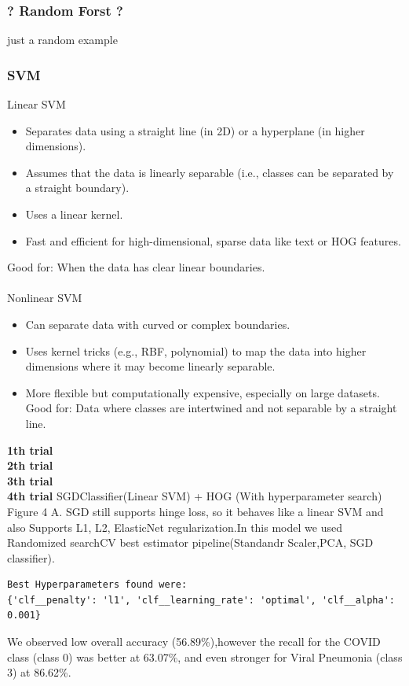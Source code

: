 \documentclass{article}
\begin{document}
\subsubsection{? Random Forst ?}
just a random example

\subsubsection{SVM}
Linear SVM
\begin{itemize}
    \item Separates data using a straight line (in 2D) or a hyperplane (in higher dimensions).
    \item Assumes that the data is linearly separable (i.e., classes can be separated by a straight boundary).
    \item Uses a linear kernel.
    \item Fast and efficient for high-dimensional, sparse data like text or HOG features.
\end{itemize}
Good for: When the data has clear linear boundaries.\\
\\
Nonlinear SVM 
\begin{itemize}
    \item Can separate data with curved or complex boundaries.
    \item Uses kernel tricks (e.g., RBF, polynomial) to map the data into higher dimensions where it may become linearly separable.
    \item More flexible but computationally expensive, especially on large datasets.
Good for: Data where classes are intertwined and not separable by a straight line.
\end{itemize}
\textbf{1th trial }\\
\textbf{2th trial }\\
\textbf{3th trial }\\
\textbf{4th trial }SGDClassifier(Linear SVM) + HOG (With hyperparameter search) Figure 4 A. SGD still supports hinge loss, so it behaves like a linear SVM and also Supports L1, L2, ElasticNet regularization.In this model we used Randomized searchCV best estimator pipeline(Standandr Scaler,PCA, SGD classifier). \begin{verbatim}
Best Hyperparameters found were:
{'clf__penalty': 'l1', 'clf__learning_rate': 'optimal', 'clf__alpha': 0.001}
\end{verbatim}
We observed low overall accuracy (56.89\%),however the recall for the COVID class (class 0) was better at 63.07\%, and even stronger for Viral Pneumonia (class 3) at 86.62\%.\\
\end{document}
